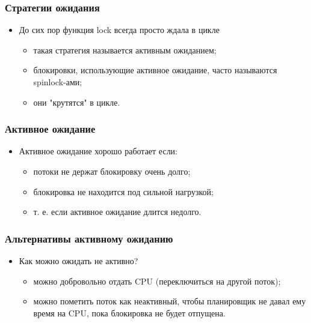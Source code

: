 \begin{frame}
\frametitle{Стратегии ожидания}
\begin{itemize}
    \item<1->До сих пор функция lock всегда просто ждала в цикле
    \begin{itemize}
        \item<2->такая стратегия называется активным ожиданием;
        \item<3->блокировки, использующие активное ожидание, часто называются
             spinlock-ами;
        \item<3->они "крутятся" в цикле.
    \end{itemize}
\end{itemize}
\end{frame}

\begin{frame}
\frametitle{Активное ожидание}
\begin{itemize}
    \item<1->Активное ожидание хорошо работает если:
    \begin{itemize}
        \item<2->потоки не держат блокировку очень долго;
        \item<3->блокировка не находится под сильной нагрузкой;
        \item<4->т. е. если активное ожидание длится недолго.
    \end{itemize}
\end{itemize}
\end{frame}

\begin{frame}
\frametitle{Альтернативы активному ожиданию}
\begin{itemize}
    \item<1->Как можно ожидать не активно?
    \begin{itemize}
        \item<2->можно добровольно отдать CPU (переключиться на другой поток);
        \item<3->можно пометить поток как неактивный, чтобы планировщик не
             давал ему время на CPU, пока блокировка не будет отпущена.
    \end{itemize}
\end{itemize}
\end{frame}
